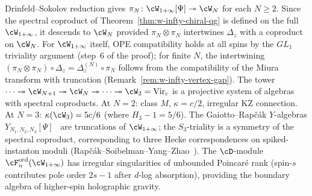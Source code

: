 \begin{remark}[Descent to $\cW_N$]
\label{rem:w-infty-descent}
Drinfeld--Sokolov reduction gives
$\pi_N \colon \cW_{1+\infty}[\Psi]
\twoheadrightarrow \cW_N$
for each $N \geq 2$. Since the spectral coproduct of
Theorem~\ref{thm:w-infty-chiral-qg} is defined
on the full $\cW_{1+\infty}$, it descends to $\cW_N$
provided $\pi_N \otimes \pi_N$ intertwines $\Delta_z$ with
a coproduct on $\cW_N$. For $\cW_{1+\infty}$ itself,
OPE compatibility holds at all spins by the $GL_1$
triviality argument (step~6 of the proof); for finite
$N$, the intertwining $(\pi_N \otimes \pi_N) \circ
\Delta_z = \Delta_z^{(N)} \circ \pi_N$ follows from the
compatibility of the Miura transform with truncation
(Remark~\ref{rem:w-infty-vertex-gap}).
The tower
$\cdots \twoheadrightarrow \cW_{N+1}
\twoheadrightarrow \cW_N
\twoheadrightarrow \cdots
\twoheadrightarrow \cW_2 = \mathrm{Vir}_c$
is a projective system of algebras with spectral
coproducts.
At $N = 2$: class $M$, $\kappa = c/2$, irregular KZ
connection. At $N = 3$: $\kappa(\cW_3) = 5c/6$ (where
$H_3 - 1 = 5/6$).
The Gaiotto--Rap\v{c}\'ak $Y$-algebras
$Y_{N_1,N_2,N_3}[\Psi]$~\cite{GR17} are truncations of
$\cW_{1+\infty}$; the $S_3$-triality is a symmetry
of the spectral coproduct, corresponding to three Hecke
correspondences on spiked-instanton moduli
(Rap\v{c}\'ak--Soibelman--Yang--Zhao~\cite{RSYZ20}).
The $\cD$-module $\cF_n^{\mathrm{ord}}(\cW_{1+\infty})$
has irregular singularities of unbounded Poincar\'e rank
(spin-$s$ contributes pole order $2s - 1$ after $d$-log
absorption), providing the boundary algebra of higher-spin
holographic gravity.
\end{remark}

